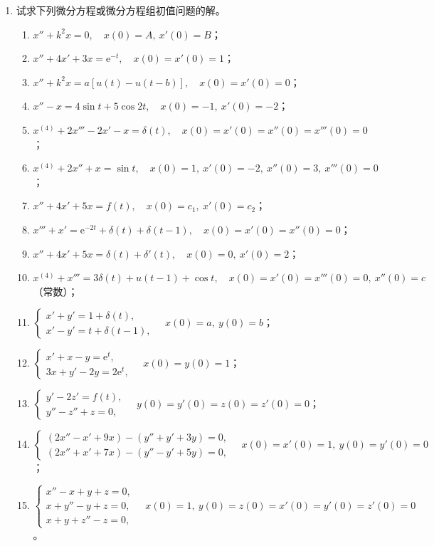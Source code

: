 \documentclass[UTF8,11pt,a4paper]{ctexart}
\newcommand{\ee}{\mathrm{e}}
\begin{document}
\begin{enumerate}
\item 试求下列微分方程或微分方程组初值问题的解。
  \begin{enumerate}
  \item $x''+k^2x=0,\quad x(0)=A,\ x'(0)=B$；
  \item $x''+4x'+3x=\ee^{-t},\quad x(0)=x'(0)=1$；
  \item $x''+k^2x=a[u(t)-u(t-b)],\quad x(0)=x'(0)=0$；
  \item $x''-x=4\sin t+5\cos2t,\quad x(0)=-1,\ x'(0)=-2$；
  \item $x^{(4)}+2x'''-2x'-x=\delta(t),\quad x(0)=x'(0)=x''(0)=x'''(0)=0$；
  \item $x^{(4)}+2x''+x=\sin t,\quad x(0)=1,\ x'(0)=-2,\ x''(0)=3,\ x'''(0)=0$；
  \item $x''+4x'+5x=f(t),\quad x(0)=c_1,\ x'(0)=c_2$；
  \item $x'''+x'=\ee^{-2t}+\delta(t)+\delta(t-1),\quad x(0)=x'(0)=x''(0)=0$；
  \item $x''+4x'+5x=\delta(t)+\delta'(t),\quad x(0)=0,\ x'(0)=2$；
  \item $x^{(4)}+x'''=3\delta(t)+u(t-1)+\cos t,\quad x(0)=x'(0)=x'''(0)=0,\ x''(0)=c$（常数）；
  \item $\displaystyle\begin{cases}x'+y'=1+\delta(t),\\x'-y'=t+\delta(t-1),\end{cases}\quad x(0)=a,\ y(0)=b$；
  \item $\displaystyle\begin{cases}x'+x-y=\ee^t,\\3x+y'-2y=2\ee^t,\end{cases}\quad x(0)=y(0)=1$；
  \item $\displaystyle\begin{cases}y'-2z'=f(t),\\y''-z''+z=0,\end{cases}\quad y(0)=y'(0)=z(0)=z'(0)=0$；
  \item $\displaystyle\begin{cases}(2x''-x'+9x)-(y''+y'+3y)=0,\\(2x''+x'+7x)-(y''-y'+5y)=0,
  \end{cases}\quad x(0)=x'(0)=1,\ y(0)=y'(0)=0$；
  \item $\displaystyle\begin{cases}x''-x+y+z=0,\\x+y''-y+z=0,\\x+y+z''-z=0,
  \end{cases}\quad x(0)=1,\ y(0)=z(0)=x'(0)=y'(0)=z'(0)=0$。
  \end{enumerate}


\end{enumerate}
\end{document}
